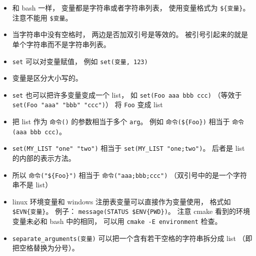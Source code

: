 \begin{itemize}
\item 和 bash 一样， 变量都是字符串或者字符串列表， 使用变量格式为 \verb`${变量}`。 注意不能用 \verb|$变量|。
\item 当字符串中没有空格时， 两边是否加双引号是等效的。 被引号引起来的就是单个字符串而不是字符串列表。
\item \verb`set` 可以对变量赋值， 例如 \verb`set(变量, 123)`
\item 变量是区分大小写的。
\item \verb`set` 也可以把许多变量变成一个 list， 如 \verb`set(Foo aaa bbb ccc)` （等效于 \verb|set(Foo "aaa" "bbb" "ccc")|） 将 \verb`Foo` 变成 list
\item 把 list 作为 \verb|命令()| 的参数相当于多个 \verb|arg|。 例如 \verb`命令(${Foo})` 相当于 \verb`命令(aaa bbb ccc)`。
\item \verb|set(MY_LIST "one" "two")| 相当于 \verb|set(MY_LIST "one;two")|。 后者是 list 的内部的表示方法。
\item 所以 \verb`命令("${Foo}")` 相当于 \verb`命令("aaa;bbb;ccc")` （双引号中的是一个字符串不是 list）
\item linux 环境变量和 windows 注册表变量可以直接作为变量使用， 格式如 \verb`$EVN{变量}`。 例子： \verb|message(STATUS $ENV{PWD})|。 注意 cmake 看到的环境变量未必和 bash 中的相同， 可以用 \verb`cmake -E environment` 检查。
\item \verb|separate_arguments(变量)| 可以把一个含有若干空格的字符串拆分成 list （即把空格替换为分号）。
\end{itemize}

